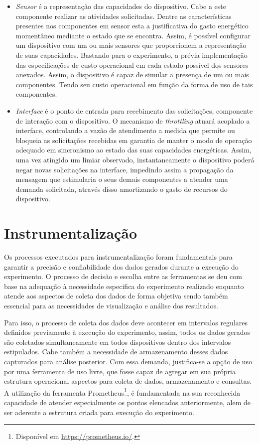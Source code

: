 \begin{itemize}
\begin{table}[htbp]
	\end{table}
	\endgroup
	
	
	 \item \textit{Sensor} é a representação das capacidades do dispositivo. Cabe a este componente realizar as atividades solicitadas. Dentre as características presentes nos componentes em sensor esta a justificativa do gasto energético momentâneo mediante o estado que se encontra. Assim, é possível configurar um dispositivo com um ou mais sensores que proporcionem a representação de suas capacidades. Bastando para o experimento, a prévia implementação das especificações de custo operacional em cada estado possível dos sensores anexados. Assim, o dispositivo é capaz de simular a presença de um ou mais componentes. Tendo seu custo operacional em função da forma de uso de tais componentes.
	 
	 \item \textit{Interface} é o ponto de entrada para recebimento das solicitações, componente de interação com o dispositivo. O mecanismo de \textit{throttling} atuará acoplado a interface, controlando a vazão de atendimento a medida que permite ou bloqueia as solicitações recebidas em garantia de manter o modo de operação adequado em sincronismo ao estado das suas capacidades energéticas. Assim, uma vez atingido um limiar observado, instantaneamente o dispositivo poderá negar novas solicitações na interface, impedindo assim a propagação da mensagem que estimularia o seus demais componentes a atender uma demanda solicitada, através disso amortizando o gasto de recursos do dispositivo.
	 
\end{itemize}

\section{Instrumentalização}
\label{cap6:instrumentalizacao}
Os processos executados para instrumentalização foram fundamentais para garantir a precisão e confiabilidade dos dados gerados durante a execução do experimento. O processo de decisão e escolha entre as ferramentas se deu com base na adequação à necessidade especifica do experimento realizado enquanto atende aos aspectos de coleta dos dados de forma objetiva sendo também essencial para as necessidades de visualização e análise dos resultados.

Para isso, o processo de coleta dos dados deve acontecer em intervalos regulares definidos previamente à execução do experimento, assim, todos os dados gerados são coletados simultaneamente em todos dispositivos dentro dos intervalos estipulados. Cabe também a necessidade de armazenamento desses dados capturados para análise posterior. Com essa demanda, justifica-se a opção de uso por uma ferramenta de uso livre, que fosse capaz de agregar em sua própria estrutura operacional aspectos para coleta de dados, armazenamento e consultas. A utilização da ferramenta Prometheus\footnote{Disponível em \url{https://prometheus.io/}.}, é fundamentada na sua reconhecida capacidade de atender especialmente os pontos elencados anteriormente, alem de ser aderente a estrutura criada para execução do experimento.


